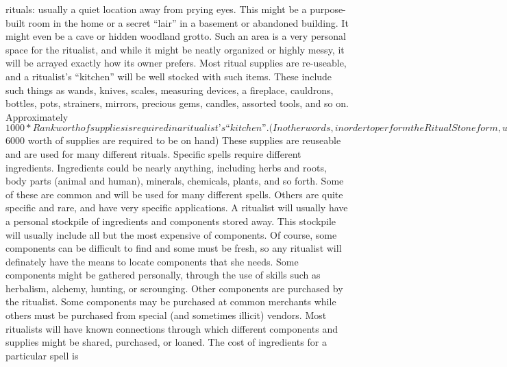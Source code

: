 \documentclass[twoside]{book}
\begin{document}
               rituals: usually a quiet location away from prying eyes.
               This might be a purpose-built room in the home or a secret
               “lair” in a basement or abandoned building. It
               might even be a cave or hidden woodland grotto. Such an
               area is a very personal space for the ritualist, and while
               it might be neatly organized or highly messy, it will be
               arrayed exactly how its owner prefers.   Most ritual supplies are re-useable, and a
               ritualist’s “kitchen” will be well
               stocked with such items. These include such things as
               wands, knives, scales, measuring devices, a fireplace,
               cauldrons, bottles, pots, strainers, mirrors, precious
               gems, candles, assorted tools, and so on. Approximately
               $1000 * Rank worth of supplies is required in a
               ritualist’s “kitchen”. (In other words,
               in order to perform the Ritual Stoneform, which is a rank
               6 spell, $6000 worth of supplies are required to be on
               hand) These supplies are reuseable and are used for many
               different rituals.   Specific spells require different ingredients.
               Ingredients could be nearly anything, including herbs and
               roots, body parts (animal and human), minerals, chemicals,
               plants, and so forth. Some of these are common and will be
               used for many different spells. Others are quite specific
               and rare, and have very specific applications. A ritualist
               will usually have a personal stockpile of ingredients and
               components stored away. This stockpile will usually
               include all but the most expensive of components. Of
               course, some components can be difficult to find and some
               must be fresh, so any ritualist will definately have the
               means to locate components that she needs. Some components
               might be gathered personally, through the use of skills
               such as herbalism, alchemy, hunting, or scrounging. Other
               components are purchased by the ritualist. Some components
               may be purchased at common merchants while others must be
               purchased from special (and sometimes illicit) vendors.
               Most ritualists will have known connections through which
               different components and supplies might be shared,
               purchased, or loaned.   The cost of ingredients for a particular spell is
\end{document}
